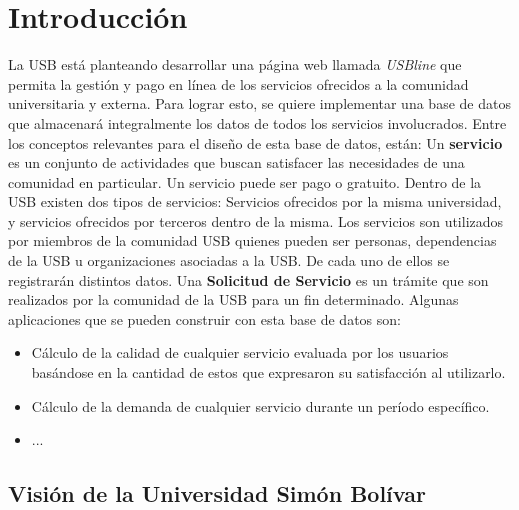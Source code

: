 \message{ !name(InformeFase2.tex)}\documentclass[12pt,a4paper,spanish]{article}
\begin{document}
\section{Introducci\'on}
\indent La USB est\'a planteando desarrollar una p\'agina web llamada \emph{USBline} que permita
la gesti\'on y pago en l\'inea de los servicios ofrecidos a la comunidad universitaria y externa. Para lograr
esto, se quiere implementar una base de datos que almacenar\'a integralmente los datos de todos los servicios
involucrados.
\newline
\newline
\indent Entre los conceptos relevantes para el dise\~no de esta base de datos, est\'an:
\newline
\newline
\indent Un \textbf{servicio} es un conjunto de actividades que buscan
satisfacer las necesidades de una comunidad en particular. Un servicio
puede ser pago o gratuito. Dentro de la USB existen dos tipos de
servicios: Servicios ofrecidos por la misma universidad, y servicios
ofrecidos por terceros dentro de la misma.
\newline
\newline
\indent Los servicios son utilizados por miembros de la comunidad USB quienes pueden ser
personas, dependencias de la USB u organizaciones asociadas a la USB. De cada uno de ellos
se registrar\'an distintos datos.
\newline
\newline
\indent Una \textbf{Solicitud de Servicio} es un tr\'amite que son
realizados por la comunidad de la USB para un fin determinado.
\newline
\newline
\indent Algunas aplicaciones que se pueden construir con esta base de datos son:
 \begin{itemize}
 \item C\'alculo de la calidad de cualquier servicio evaluada por los usuarios bas\'andose
en la cantidad de estos que expresaron su satisfacci\'on al utilizarlo.
 \item C\'alculo de la demanda de cualquier servicio durante un per\'iodo espec\'ifico.
 \item ...
\end{itemize}

\subsection{Visi\'on de la Universidad Sim\'on Bol\'ivar}
\end{document}
